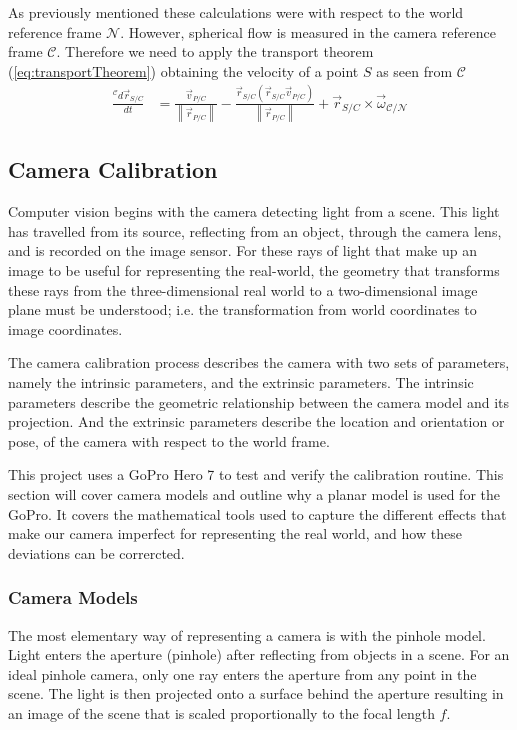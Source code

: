 \documentclass{UoNMCHA}
\newcommand{\norm}[1]{\left\lVert#1\right\rVert}
\numberwithin{equation}{section}
\begin{document}
As previously mentioned these calculations were with respect to the world reference frame $\mathcal{N}$. However, spherical flow is measured in the camera reference frame $\mathcal{C}$. Therefore we need to apply the transport theorem (\ref{eq:transportTheorem}) obtaining the velocity of a point $S$ as seen from $\mathcal{C}$
\begin{equation}
	\begin{split}
		\frac{{}^\mathcal{C}d\vec{r}_{S/C}}{dt} &=\frac{\vec{v}_{P/C}}{\norm{\vec{r}_{P/C}}} - \frac{\vec{r}_{S/C}(\vec{r}_{S/C}\vec{v}_{P/C})}{\norm{\vec{r}_{P/C}}} + \vec{r}_{S/C}\times\vec{\omega}_{\mathcal{C}/\mathcal{N}}
	\end{split}
\end{equation}

\subsection{Camera Calibration}\label{sec:Background_cameraCal} %
Computer vision begins with the camera detecting light from a scene. This light has travelled from its source, reflecting from an object, through the camera lens, and is recorded on the image sensor. For these rays of light that make up an image to be useful for representing the real-world, the geometry that transforms these rays from the three-dimensional real world to a two-dimensional image plane must be understood; i.e. the transformation from world coordinates to image coordinates.

The camera calibration process describes the camera with two sets of parameters, namely the intrinsic parameters, and the extrinsic parameters. The intrinsic parameters describe the geometric relationship between the camera model and its projection. And the extrinsic parameters describe the location and orientation or pose, of the camera with respect to the world frame.

This project uses a GoPro Hero 7 to test and verify the calibration routine. This section will cover camera models and outline why a planar model is used for the GoPro. It covers the mathematical tools used to capture the different effects that make our camera imperfect for representing the real world, and how these deviations can be corrercted.
\subsubsection{Camera Models}
The most elementary way of representing a camera is with the pinhole model. Light enters the aperture (pinhole) after reflecting from objects in a scene. For an ideal pinhole camera, only one ray enters the aperture from any point in the scene. The light is then projected onto a surface behind the aperture resulting in an image of the scene that is scaled proportionally to the focal length $f$.
\end{document}
